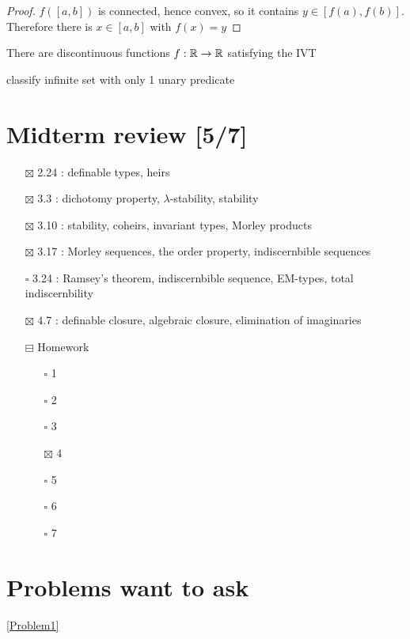 \documentclass[11pt]{article}
\begin{document}
\begin{proof}
\(f([a,b])\) is connected, hence convex, so it contains \(y\in[f(a),f(b)]\). Therefore there
is \(x\in[a,b]\) with \(f(x)=y\)
\end{proof}

There are discontinuous functions \(f:\mathbb{R}\to\mathbb{R}\) satisfying the IVT

classify infinite set with only 1 unary predicate

\section{Midterm review [5/7]}
\label{sec:org8827718}
\begin{itemize}
\item[{$\boxtimes$}] 2.24 : definable types, heirs
\item[{$\boxtimes$}] 3.3 : dichotomy property, \(\lambda\)-stability, stability
\item[{$\boxtimes$}] 3.10 : stability, coheirs, invariant types, Morley products
\item[{$\boxtimes$}] 3.17 : Morley sequences, the order property, indiscernbible sequences
\item[{$\square$}] 3.24 : Ramsey's theorem, indiscernbible sequence, EM-types, total indiscernbility
\item[{$\boxtimes$}] 4.7 : definable closure, algebraic closure, elimination of imaginaries
\item[{$\boxminus$}] Homework
\begin{itemize}
\item[{$\square$}] 1
\item[{$\square$}] 2
\item[{$\square$}] 3
\item[{$\boxtimes$}] 4
\item[{$\square$}] 5
\item[{$\square$}] 6
\item[{$\square$}] 7
\end{itemize}
\end{itemize}

\section{Problems want to ask}
\label{sec:org1365afa}
\ref{Problem1}
\end{document}
